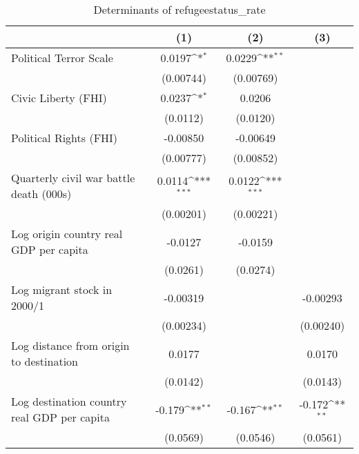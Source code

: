 \begin{table}[htbp]\centering
\def\sym#1{\ifmmode^{#1}\else\(^{#1}\)\fi}
\caption{Determinants of refugeestatus\_rate}
\begin{tabular}{l*{3}{c}}
\hline\hline
                    &\multicolumn{1}{c}{(1)}         &\multicolumn{1}{c}{(2)}         &\multicolumn{1}{c}{(3)}         \\
\hline
Political Terror Scale&      0.0197\sym{*}  &      0.0229\sym{**} &                     \\
                    &   (0.00744)         &   (0.00769)         &                     \\
[1em]
Civic Liberty (FHI) &      0.0237\sym{*}  &      0.0206         &                     \\
                    &    (0.0112)         &    (0.0120)         &                     \\
[1em]
Political Rights (FHI)&    -0.00850         &    -0.00649         &                     \\
                    &   (0.00777)         &   (0.00852)         &                     \\
[1em]
Quarterly civil war battle death (000s)&      0.0114\sym{***}&      0.0122\sym{***}&                     \\
                    &   (0.00201)         &   (0.00221)         &                     \\
[1em]
Log origin country real GDP per capita&     -0.0127         &     -0.0159         &                     \\
                    &    (0.0261)         &    (0.0274)         &                     \\
[1em]
Log migrant stock in 2000/1&    -0.00319         &                     &    -0.00293         \\
                    &   (0.00234)         &                     &   (0.00240)         \\
[1em]
Log distance from origin to destination&      0.0177         &                     &      0.0170         \\
                    &    (0.0142)         &                     &    (0.0143)         \\
[1em]
Log destination country real GDP per capita&      -0.179\sym{**} &      -0.167\sym{**} &      -0.172\sym{**} \\
                    &    (0.0569)         &    (0.0546)         &    (0.0561)         \\

\end{tabular}
\end{table}
